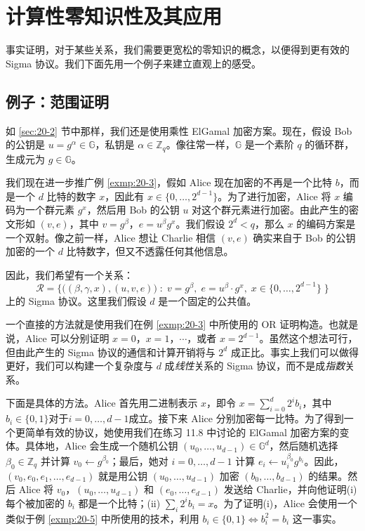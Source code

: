 \section{计算性零知识性及其应用}

事实证明，对于某些关系，我们需要更宽松的零知识的概念，以便得到更有效的 Sigma 协议。我们下面先用一个例子来建立直观上的感受。

\subsection{例子：范围证明}\label{subsec:20-4-1}

如 \ref{sec:20-2} 节中那样，我们还是使用乘性 ElGamal 加密方案。现在，假设 Bob 的公钥是 $u=g^\alpha\in\mathbb{G}$，私钥是 $\alpha\in\mathbb{Z}_q$。像往常一样，$\mathbb G$ 是一个素阶 $q$ 的循环群，生成元为 $g\in\mathbb{G}$。

我们现在进一步推广例 \ref{exmp:20-3}，假如 Alice 现在加密的不再是一个比特 $b$，而是一个 $d$ 比特的数字 $x$，因此有 $x\in\{0,\dots,2^{d-1}\}$。为了进行加密，Alice 将 $x$ 编码为一个群元素 $g^x$，然后用 Bob 的公钥 $u$ 对这个群元素进行加密。由此产生的密文形如 $(v,e)$，其中 $v=g^\beta$，$e=u^\beta g^x$。我们假设 $2^d<q$，那么 $x$ 的编码方案是一个双射。像之前一样，Alice 想让 Charlie 相信 $(v,e)$ 确实来自于 Bob 的公钥加密的一个 $d$ 比特数字，但又不透露任何其他信息。

因此，我们希望有一个关系：
\begin{equation}
\mathcal{R}=
\bigg\lbrace
\Big((\beta,\gamma,x),(u,v,e)\Big)\;:\;
v=g^\beta,\;
e=u^\beta\cdot g^x,\;
x\in\{0,\dots,2^{d-1}\}\;
\bigg\rbrace
\end{equation}
上的 Sigma 协议。这里我们假设 $d$ 是一个固定的公共值。

一个直接的方法就是使用我们在例 \ref{exmp:20-3} 中所使用的 OR 证明构造。也就是说，Alice 可以分别证明 $x=0$，$x=1$，$\cdots$，或者 $x=2^{d-1}$。虽然这个想法可行，但由此产生的 Sigma 协议的通信和计算开销将与 $2^d$ 成正比。事实上我们可以做得更好，我们可以构建一个复杂度与 $d$ 成\emph{线性}关系的 Sigma 协议，而不是成\emph{指数}关系。

下面是具体的方法。Alice 首先用二进制表示 $x$，即令 $x=\sum_{i=0}^d2^ib_i$，其中$b_i\in\{0,1\}$对于$i=0,\dots,d-1$成立。接下来 Alice 分别加密每一比特。为了得到一个更简单有效的协议，她使用我们在练习 11.8 中讨论的 ElGamal 加密方案的变体。具体地，Alice 会生成一个随机公钥 $(u_0,\dots,u_{d-1})\in\mathbb{G}^d$，然后随机选择 $\beta_0\in\mathbb{Z}_q$ 并计算 $v_0\leftarrow g^{\beta_0}$；最后，她对 $i=0,\dots,d-1$ 计算 $e_i\leftarrow u_i^{\beta_0}g^{b_i}$。因此，$(v_0,e_0,e_1,\dots,e_{d-1})$ 就是用公钥 $(u_0,\dots,u_{d-1})$ 加密 $(b_0,\dots,b_{d-1})$ 的结果。然后 Alice 将 $v_0$，$(u_0,\dots,u_{d-1})$ 和 $(e_0,\dots,e_{d-1})$ 发送给 Charlie，并向他证明(i)每个被加密的 $b_i$ 都是一个比特；(ii) $\sum_{i}2^ib_i=x$。为了证明(i)，Alice 会使用一个类似于例 \ref{exmp:20-5} 中所使用的技术，利用 $b_i\in\{0,1\}\iff b_i^2=b_i$ 这一事实。

